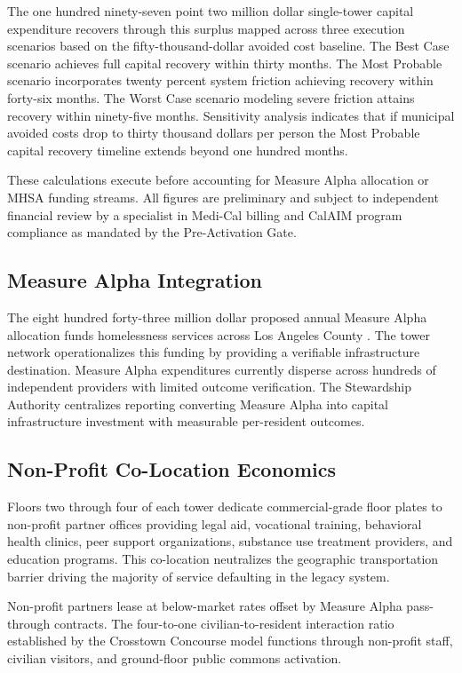 \documentclass[12pt, letterpaper]{article}
\begin{document}
The one hundred ninety-seven point two million dollar single-tower capital expenditure recovers through this surplus mapped across three execution scenarios based on the fifty-thousand-dollar avoided cost baseline. The Best Case scenario achieves full capital recovery within thirty months. The Most Probable scenario incorporates twenty percent system friction achieving recovery within forty-six months. The Worst Case scenario modeling severe friction attains recovery within ninety-five months. Sensitivity analysis indicates that if municipal avoided costs drop to thirty thousand dollars per person the Most Probable capital recovery timeline extends beyond one hundred months.

These calculations execute before accounting for Measure Alpha allocation or MHSA funding streams. All figures are preliminary and subject to independent financial review by a specialist in Medi-Cal billing and CalAIM program compliance as mandated by the Pre-Activation Gate.

\subsection{Measure Alpha Integration}

The eight hundred forty-three million dollar proposed annual Measure Alpha allocation funds homelessness services across Los Angeles County \citep{lac_ceo_measure_a_2025, lac_homeless_initiative_2025}. The tower network operationalizes this funding by providing a verifiable infrastructure destination. Measure Alpha expenditures currently disperse across hundreds of independent providers with limited outcome verification. The Stewardship Authority centralizes reporting converting Measure Alpha into capital infrastructure investment with measurable per-resident outcomes.

\subsection{Non-Profit Co-Location Economics}

Floors two through four of each tower dedicate commercial-grade floor plates to non-profit partner offices providing legal aid, vocational training, behavioral health clinics, peer support organizations, substance use treatment providers, and education programs. This co-location neutralizes the geographic transportation barrier driving the majority of service defaulting in the legacy system.

Non-profit partners lease at below-market rates offset by Measure Alpha pass-through contracts. The four-to-one civilian-to-resident interaction ratio established by the Crosstown Concourse model \citep{crosstown_concourse_2017} functions through non-profit staff, civilian visitors, and ground-floor public commons activation.
\end{document}
